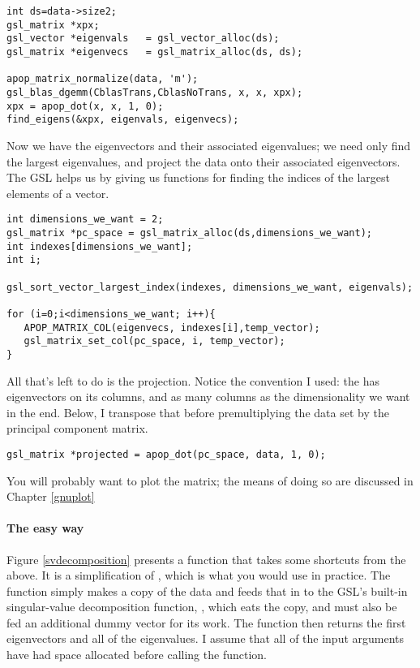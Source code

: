 \begin{lstlisting}
int ds=data->size2;
gsl_matrix *xpx;
gsl_vector *eigenvals   = gsl_vector_alloc(ds);
gsl_matrix *eigenvecs   = gsl_matrix_alloc(ds, ds);

apop_matrix_normalize(data, 'm');
gsl_blas_dgemm(CblasTrans,CblasNoTrans, x, x, xpx);
xpx = apop_dot(x, x, 1, 0);
find_eigens(&xpx, eigenvals, eigenvecs);
\end{lstlisting}

Now we have the eigenvectors and their associated eigenvalues; we need only find
the largest eigenvalues, and project the data onto their associated eigenvectors.
The GSL helps us by giving us functions for
finding the indices of the largest elements of a vector.
\begin{lstlisting}
int dimensions_we_want = 2;
gsl_matrix *pc_space = gsl_matrix_alloc(ds,dimensions_we_want);
int indexes[dimensions_we_want];
int i;

gsl_sort_vector_largest_index(indexes, dimensions_we_want, eigenvals);

for (i=0;i<dimensions_we_want; i++){
   APOP_MATRIX_COL(eigenvecs, indexes[i],temp_vector);
   gsl_matrix_set_col(pc_space, i, temp_vector);
}
\end{lstlisting}

All that's left to do is the projection. Notice the convention I used:
the  has eigenvectors on its columns, and as many columns as the
dimensionality we want in the end. Below, I transpose that before premultiplying
the data set by the principal component matrix.

\begin{lstlisting}
gsl_matrix *projected = apop_dot(pc_space, data, 1, 0);
\end{lstlisting}

You will probably want to plot the  matrix; the means
of doing so are discussed in Chapter \ref{gnuplot}

\paragraph{The easy way}

Figure \ref{svdecomposition} presents a function that takes some
shortcuts from the above. It is a
simplification of , which is what you would use in practice. The function simply makes
a copy of the data and feeds that in to the GSL's built-in singular-value
decomposition function, , which eats the copy, and must also be fed an
additional dummy vector for its work. The function then returns the first
 eigenvectors and all of the eigenvalues. I
assume that all of the input arguments have had space allocated before
calling the function.  


